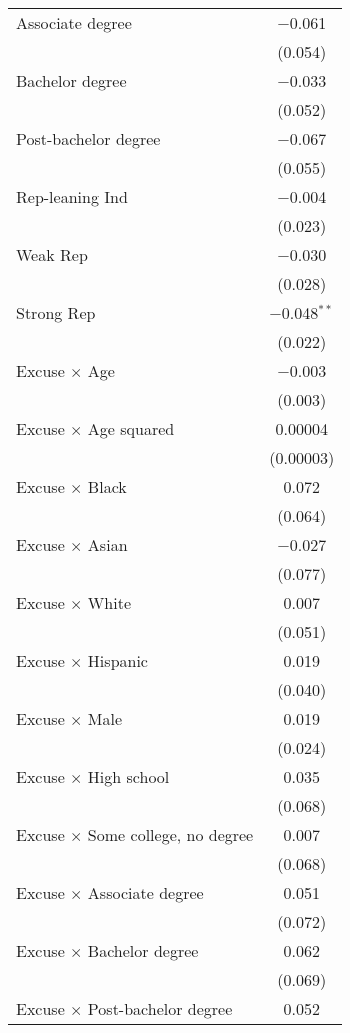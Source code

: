 \begin{center}
\begin{ThreePartTable}
\begin{longtable}{lc}
 \addlinespace 
 Associate degree & $-$0.061 \\ 
  & (0.054) \\ 
 \addlinespace 
 Bachelor degree & $-$0.033 \\ 
  & (0.052) \\ 
 \addlinespace 
 Post-bachelor degree & $-$0.067 \\ 
  & (0.055) \\ 
 \addlinespace 
 Rep-leaning Ind & $-$0.004 \\ 
  & (0.023) \\ 
 \addlinespace 
 Weak Rep & $-$0.030 \\ 
  & (0.028) \\ 
 \addlinespace 
 Strong Rep & $-$0.048$^{**}$ \\ 
  & (0.022) \\ 
 \addlinespace 
 Excuse $\times$ Age & $-$0.003 \\ 
  & (0.003) \\ 
 \addlinespace 
 Excuse $\times$ Age squared & 0.00004 \\ 
  & (0.00003) \\ 
 \addlinespace 
 Excuse $\times$ Black & 0.072 \\ 
  & (0.064) \\ 
 \addlinespace 
 Excuse $\times$ Asian & $-$0.027 \\ 
  & (0.077) \\ 
 \addlinespace 
 Excuse $\times$ White & 0.007 \\ 
  & (0.051) \\ 
 \addlinespace 
 Excuse $\times$ Hispanic & 0.019 \\ 
  & (0.040) \\ 
 \addlinespace 
 Excuse $\times$ Male & 0.019 \\ 
  & (0.024) \\ 
 \addlinespace 
 Excuse $\times$ High school & 0.035 \\ 
  & (0.068) \\ 
 \addlinespace 
 Excuse $\times$ Some college, no degree & 0.007 \\ 
  & (0.068) \\ 
 \addlinespace 
 Excuse $\times$ Associate degree & 0.051 \\ 
  & (0.072) \\ 
 \addlinespace 
 Excuse $\times$ Bachelor degree & 0.062 \\ 
  & (0.069) \\ 
 \addlinespace 
 Excuse $\times$ Post-bachelor degree & 0.052 \\ 

\end{longtable}
\end{ThreePartTable}
\end{center}
